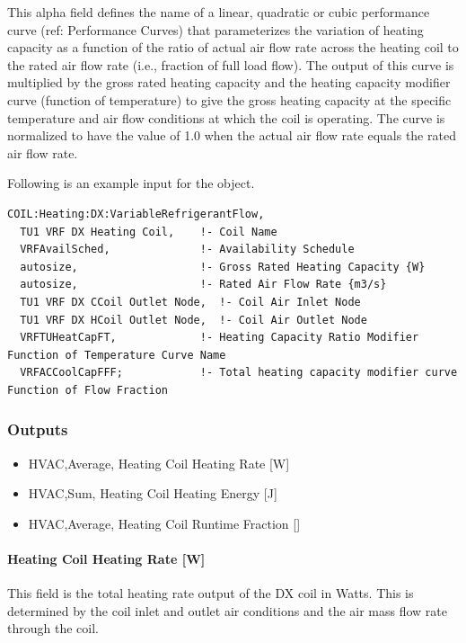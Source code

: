 This alpha field defines the name of a linear, quadratic or cubic performance curve (ref: Performance Curves) that parameterizes the variation of heating capacity as a function of the ratio of actual air flow rate across the heating coil to the rated air flow rate (i.e., fraction of full load flow). The output of this curve is multiplied by the gross rated heating capacity and the heating capacity modifier curve (function of temperature) to give the gross heating capacity at the specific temperature and air flow conditions at which the coil is operating. The curve is normalized to have the value of 1.0 when the actual air flow rate equals the rated air flow rate.

Following is an example input for the object.

\begin{lstlisting}
COIL:Heating:DX:VariableRefrigerantFlow,
  TU1 VRF DX Heating Coil,    !- Coil Name
  VRFAvailSched,              !- Availability Schedule
  autosize,                   !- Gross Rated Heating Capacity {W}
  autosize,                   !- Rated Air Flow Rate {m3/s}
  TU1 VRF DX CCoil Outlet Node,  !- Coil Air Inlet Node
  TU1 VRF DX HCoil Outlet Node,  !- Coil Air Outlet Node
  VRFTUHeatCapFT,             !- Heating Capacity Ratio Modifier Function of Temperature Curve Name
  VRFACCoolCapFFF;            !- Total heating capacity modifier curve Function of Flow Fraction
\end{lstlisting}

\subsubsection{Outputs}\label{outputs-6-003}

\begin{itemize}
\item
  HVAC,Average, Heating Coil Heating Rate {[}W{]}
\item
  HVAC,Sum, Heating Coil Heating Energy {[}J{]}
\item
  HVAC,Average, Heating Coil Runtime Fraction {[]}
\end{itemize}

\paragraph{Heating Coil Heating Rate {[}W{]}}\label{heating-coil-heating-rate-w-4}

This field is the total heating rate output of the DX coil in Watts. This is determined by the coil inlet and outlet air conditions and the air mass flow rate through the coil.

